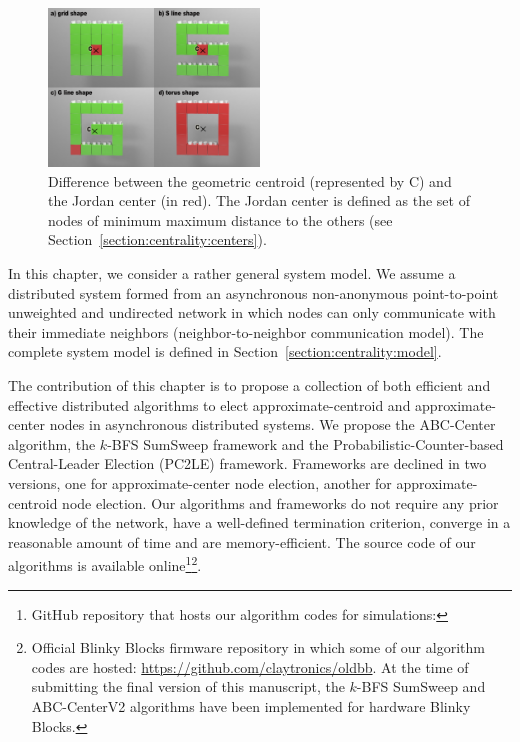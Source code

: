 \begin{figure}[!h]
	\centering
	\includegraphics[width=0.5\textwidth]{images/centrality/shapes.jpg}
	\caption{Difference between the geometric centroid (represented by C) and the Jordan center (in red). The Jordan center is defined as the set of nodes of minimum maximum distance to the others (see Section~\ref{section:centrality:centers}).\label{fig:centrality:shape-centers}}
\end{figure}

In this chapter, we consider a rather general system model. We assume a distributed system formed from an asynchronous non-anonymous point-to-point unweighted and undirected network in which nodes can only communicate with their immediate neighbors (neighbor-to-neighbor communication model). The complete system model is defined in Section~\ref{section:centrality:model}.

The contribution of this chapter is to propose a collection of both efficient and effective distributed algorithms to elect approximate-centroid and approximate-center nodes in asynchronous distributed systems. We propose the ABC-Center algorithm, the $k$-BFS SumSweep framework and the Probabilistic-Counter-based Central-Leader Election (PC2LE) framework. Frameworks are declined in two versions, one for approximate-center node election, another for approximate-centroid node election. Our algorithms and frameworks do not require any prior knowledge of the network, have a well-defined termination criterion, converge in a reasonable amount of time and are memory-efficient. The source code of our algorithms is available online\footnote{GitHub repository that hosts our algorithm codes for simulations: \VisibleSimUrl{}}\footnote{Official Blinky Blocks firmware repository in which some of our algorithm codes are hosted: \url{https://github.com/claytronics/oldbb}. At the time of submitting the final version of this manuscript, the $k$-BFS SumSweep and ABC-CenterV2 algorithms have been implemented for hardware Blinky Blocks.}.

